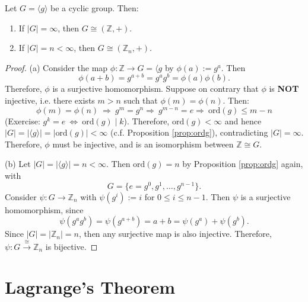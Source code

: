 \begin{theorem}
Let $G = \langle g \rangle$ be a cyclic group. Then:
\begin{enumerate}
    \item[(a)] If $|G| = \infty$, then $G \cong (\mathbb{Z}, +)$.
    \item[(b)] If $|G| = n < \infty$, then $G \cong (\mathbb{Z}_n, +)$.
\end{enumerate}
\end{theorem}

\begin{proof}
(a) Consider the map $\phi : \mathbb{Z} \to G = \langle g$ by $\phi(a) := g^a$.
Then 
$$\phi(a+b) = g^{a+b} = g^a g^b = \phi(a) \phi(b).$$ 
Therefore, $\phi$ is a surjective homomorphism. Suppose on contrary that $\phi$ is \textbf{NOT} injective, i.e. there exists $m > n$ such that $\phi(m) = \phi(n)$. Then: 
$$\phi(m) = \phi(n) \ \Rightarrow\ g^m = g^n \Rightarrow\ g^{m-n} = e \Rightarrow\ \text{ord}(g) \le m-n$$ 
(Exercise: $g^k = e\ \Leftrightarrow\ \text{ord}(g) \mid k$). Therefore, $\text{ord}(g) < \infty$ and hence $|G| = |\langle g \rangle| = |\text{ord}(g)| < \infty$ (c.f. Proposition \ref{prop:ordg}), contradicting $|G| = \infty$. Therefore, $\phi$ must be injective, and is an isomorphism between $\mathbb{Z} \cong G$.

\vspace{1em}
\noindent (b) Let $|G| = |\langle g \rangle| = n < \infty$. Then $\text{ord}(g) = n$ by Proposition \ref{prop:ordg} again, with
$$G = \{e =g^0, g^1, \dots, g^{n-1}\}.$$
Consider $\psi : G \to \mathbb{Z}_n$ with $\psi(g^i) := i$ for $0 \leq i \leq n-1$.
Then $\psi$ is a surjective homomorphism, since 
$$\psi(g^a g^b) = \psi(g^{a+b}) = a+b = \psi(g^a) + \psi(g^b).$$ 
Since $|G| = |\mathbb{Z}_n| = n$, then any surjective map is also injective. Therefore, $\psi : G \xrightarrow{\cong} \mathbb{Z}_n$ is bijective.
\end{proof}


\section{Lagrange's Theorem} \label{sec:Lagrange}

